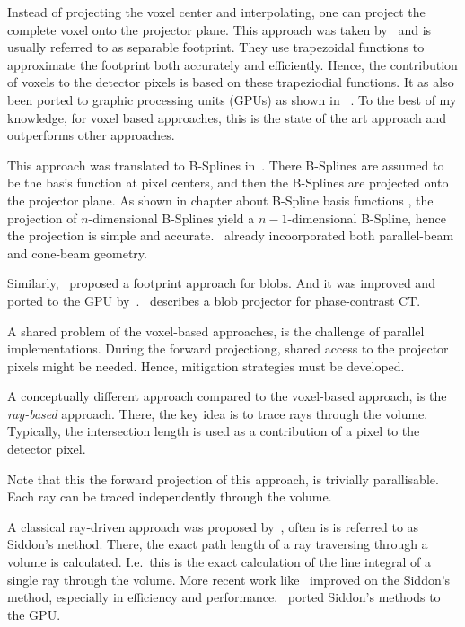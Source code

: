 Instead of projecting the voxel center and interpolating, one can project the complete voxel onto
the projector plane. This approach was taken by~\cite{long_3d_2010, long_3d_nodate} and is usually
referred to as separable footprint. They use trapezoidal functions to approximate the footprint both
accurately and efficiently. Hence, the contribution of voxels to the detector pixels is based on
these trapeziodial functions. It as also been ported to graphic processing units (GPUs) as shown in
~\cite{wu_gpu_2011, xie_effective_2015, chapdelaine_new_nodate}. To the best of my knowledge, for
voxel based approaches, this is the state of the art approach and outperforms other approaches.

This approach was translated to B-Splines in~\cite{momey_b-spline_2012, momey_spline_2015}. There
B-Splines are assumed to be the basis function at pixel centers, and then the B-Splines are
projected onto the projector plane. As shown in chapter about B-Spline basis functions
, the projection of \(n\)-dimensional B-Splines yield a
\(n-1\)-dimensional B-Spline, hence the projection is simple and
accurate.~\cite{momey_b-spline_2012} already incoorporated both parallel-beam and cone-beam
geometry.

Similarly,~\cite{ziegler_efficient_2006} proposed a footprint approach for blobs. And it was
improved and ported to the GPU by~\cite{bippus_projector_2011}.~\cite{kohler_iterative_2011}
describes a blob projector for phase-contrast CT\@.

A shared problem of the voxel-based approaches, is the challenge of parallel implementations. During
the forward projectiong, shared access to the projector pixels might be needed. Hence, mitigation
strategies must be developed.

A conceptually different approach compared to the voxel-based approach, is the \textit{ray-based}
approach. There, the key idea is to trace rays through the volume. Typically, the intersection
length is used as a contribution of a pixel to the detector pixel.

Note that this the forward projection of this approach, is trivially parallisable. Each ray can be
traced independently through the volume.

A classical ray-driven approach was proposed by~\cite{siddon_fast_1985}, often is is referred to as
Siddon's method. There, the exact path length of a ray traversing through a volume is calculated.
I.e.\, this is the exact calculation of the line integral of a single ray through the volume. More
recent work like~\cite{jacobs_fast_1998, christiaens_fast_1999, zhao_fast_2004, gao_fast_2012}
improved on the Siddon's method, especially in efficiency and
performance.~\cite{de_greef_accelerated_2009, xiao_efficient_2012} ported Siddon's methods to the
GPU\@.

